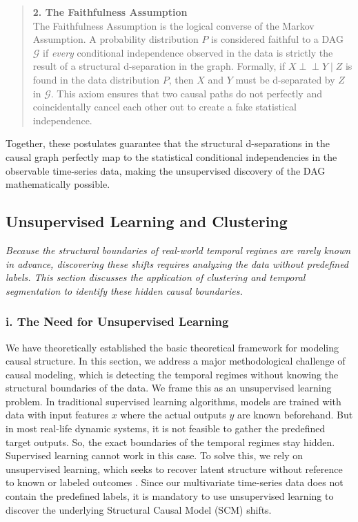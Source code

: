 \begin{quote}
\textbf{2. The Faithfulness Assumption}\\
The Faithfulness Assumption is the logical converse of the Markov Assumption. A probability distribution $P$ is considered faithful to a DAG $\mathcal{G}$ if \textit{every} conditional independence observed in the data is strictly the result of a structural d-separation in the graph.
Formally, if $X \perp\!\!\!\perp Y \mid Z$ is found in the data distribution $P$, then $X$ and $Y$ must be d-separated by $Z$ in $\mathcal{G}$. This axiom ensures that two causal paths do not perfectly and coincidentally cancel each other out to create a fake statistical independence.
\end{quote}

Together, these postulates guarantee that the structural d-separations in the causal graph perfectly map to the statistical conditional independencies in the observable time-series data, making the unsupervised discovery of the DAG mathematically possible.


\subsection{Unsupervised Learning and Clustering}

\textit{Because the structural boundaries of real-world temporal regimes are rarely known in advance, discovering these shifts requires analyzing the data without predefined labels. This section discusses the application of clustering and temporal segmentation to identify these hidden causal boundaries.}

\subsubsection*{i. The Need for Unsupervised Learning}

We have theoretically established the basic theoretical framework for modeling causal structure. In this section, we address a major methodological challenge of causal modeling, which is detecting the temporal regimes without knowing the structural boundaries of the data. We frame this as an unsupervised learning problem. In traditional supervised learning algorithms, models are trained with data with input features $x$ where the actual outputs $y$ are known beforehand. But in most real-life dynamic systems, it is not feasible to gather the predefined target outputs. So, the exact boundaries of the temporal regimes stay hidden. Supervised learning cannot work in this case. To solve this, we rely on unsupervised learning, which seeks to recover latent structure without reference to known or labeled outcomes \cite{hastie2009}. Since our multivariate time-series data does not contain the predefined labels, it is mandatory to use unsupervised learning to discover the underlying Structural Causal Model (SCM) shifts.

